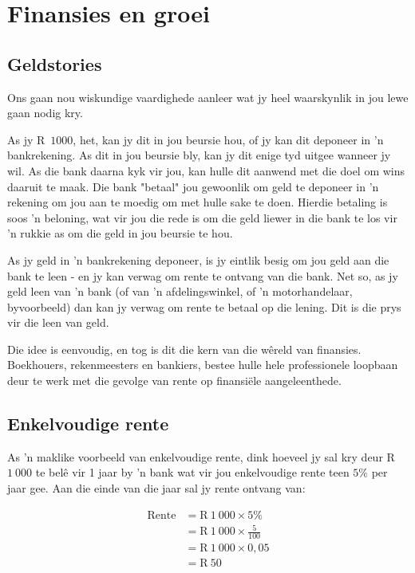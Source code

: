 \chapter{Finansies en groei}

\section{Geldstories}

Ons gaan nou wiskundige vaardighede aanleer wat jy heel waarskynlik in jou lewe gaan nodig kry.\par

As jy R~$1 000$, het, kan jy dit in jou beursie hou, of jy kan dit deponeer in ’n bankrekening. As dit in jou beursie bly,
kan jy dit enige tyd uitgee wanneer jy wil. As die bank daarna kyk vir jou, kan hulle dit aanwend met die doel om
wins daaruit te maak. Die bank "betaal" jou gewoonlik om geld te deponeer in ’n rekening om jou aan te moedig
om met hulle sake te doen. Hierdie betaling is soos ’n beloning, wat vir jou die rede is om die geld liewer in die
bank te los vir ’n rukkie as om die geld in jou beursie te hou.\par 

As jy geld in ’n bankrekening deponeer, is jy eintlik besig om jou geld aan die bank te leen - en jy kan verwag om
rente te ontvang van die bank. Net so, as jy geld leen van ’n bank (of van ’n afdelingswinkel, of ’n motorhandelaar,
byvoorbeeld) dan kan jy verwag om rente te betaal op die lening. Dit is die prys vir die leen van geld.\par

Die idee is eenvoudig, en tog is dit die kern van die w\^{e}reld van finansies. Boekhouers, rekenmeesters en
bankiers, bestee hulle hele professionele loopbaan deur te werk met die gevolge van rente op
finansiële aangeleenthede.\par

\section{Enkelvoudige rente}
  
As ’n maklike voorbeeld van enkelvoudige rente, dink hoeveel jy sal kry deur R~$1~000$ te belê vir 1 jaar by ’n bank
wat vir jou enkelvoudige rente teen $5\%$ per jaar gee. Aan die einde van die jaar sal jy rente ontvang van:\par
\begin{align*}
    \mbox{Rente} &= \mbox{R}~1~000 \times 5\%\\
    &= \mbox{R}~1~000 \times \frac{5}{100}\\
    &= \mbox{R}~1~000 \times 0,05\\
    &= \mbox{R}~50
\end{align*}


